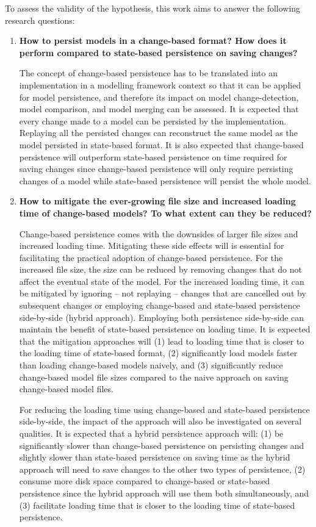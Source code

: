\documentclass[12pt, a4paper]{report} \usepackage[titletoc]{appendix}
\begin{document}
To assess the validity of the hypothesis, this work aims to answer the following research questions: 
\begin{enumerate} 
\item \textbf{How to persist models in a change-based format? How does it perform compared to state-based persistence on saving changes?} 

The concept of change-based persistence has to be translated into an implementation in a modelling framework context so that it can be applied for model persistence, and therefore its impact on model change-detection, model comparison, and model merging can be assessed. It is expected that every change made to a model can be persisted by the implementation. Replaying all the persisted changes can reconstruct the same model as the model persisted in state-based format. It is also expected that change-based persistence will outperform state-based persistence on time required for saving changes since change-based persistence will only require persisting changes of a model while state-based persistence will persist the whole model. 

\item \textbf{How to mitigate the ever-growing file size and increased loading time of change-based models? To what extent can they be reduced?} 

Change-based persistence comes with the downsides of larger file sizes and increased loading time. Mitigating these side effects will is essential for facilitating the practical adoption of change-based persistence. For the increased file size, the size can be reduced by removing changes that do not affect the eventual state of the model. For the increased loading time, it can be mitigated by ignoring -- not replaying -- changes that are cancelled out by subsequent changes or employing change-based and state-based persistence side-by-side (hybrid approach). Employing both persistence side-by-side can maintain the benefit of state-based persistence on loading time. It is expected that the mitigation approaches will (1) lead to loading time that is closer to the loading time of state-based format, (2) significantly load models faster than loading change-based models naively, and (3) significantly reduce change-based model file sizes compared to the naive approach on saving change-based model files. 

For reducing the loading time using change-based and state-based persistence side-by-side, the impact of the approach will also be investigated on several qualities. It is expected that a hybrid persistence approach will: (1) be significantly slower than change-based persistence on persisting changes and slightly slower than state-based persistence on saving time as the hybrid approach will need to save changes to the other two types of persistence, (2) consume more disk space compared to change-based or state-based persistence since the hybrid approach will use them both simultaneously, and (3) facilitate loading time that is closer to the loading time of state-based persistence. 


\end{enumerate}
\end{document}
